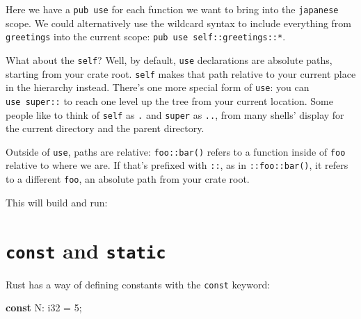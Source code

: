 \documentclass[a4paper,]{book}
\newenvironment{Shaded}{\begin{snugshade}}{\end{snugshade}}
\newcommand{\KeywordTok}[1]{\textcolor[rgb]{0.13,0.29,0.53}{\textbf{{#1}}}}
\newcommand{\DataTypeTok}[1]{\textcolor[rgb]{0.13,0.29,0.53}{{#1}}}
\newcommand{\DecValTok}[1]{\textcolor[rgb]{0.00,0.00,0.81}{{#1}}}
\newcommand{\NormalTok}[1]{{#1}}
\begin{document}
Here we have a \texttt{pub\ use} for each function we want to bring into
the \texttt{japanese} scope. We could alternatively use the wildcard
syntax to include everything from \texttt{greetings} into the current
scope: \texttt{pub\ use\ self::greetings::*}.

What about the \texttt{self}? Well, by default, \texttt{use}
declarations are absolute paths, starting from your crate root.
\texttt{self} makes that path relative to your current place in the
hierarchy instead. There's one more special form of \texttt{use}: you
can \texttt{use\ super::} to reach one level up the tree from your
current location. Some people like to think of \texttt{self} as
\texttt{.} and \texttt{super} as \texttt{..}, from many shells' display
for the current directory and the parent directory.

Outside of \texttt{use}, paths are relative: \texttt{foo::bar()} refers
to a function inside of \texttt{foo} relative to where we are. If that's
prefixed with \texttt{::}, as in \texttt{::foo::bar()}, it refers to a
different \texttt{foo}, an absolute path from your crate root.

This will build and run:

\begin{Shaded}
\end{Shaded}

\section{\texorpdfstring{\texttt{const} and
\texttt{static}}{const and static}}\label{sec--const-and-static}

Rust has a way of defining constants with the \texttt{const} keyword:

\begin{Shaded}
\begin{Highlighting}[]
\KeywordTok{const} \NormalTok{N: }\DataTypeTok{i32} \NormalTok{= }\DecValTok{5}\NormalTok{;}
\end{Highlighting}
\end{Shaded}
\end{document}
